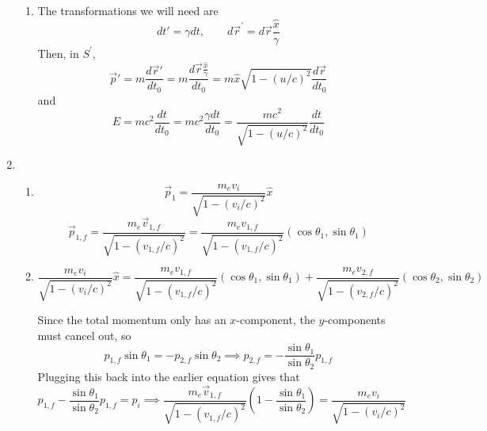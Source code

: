 \documentclass[fleqn]{article}[12pt]
\begin{document}
\begin{enumerate}
\begin{enumerate}
        \item The transformations we will need are
        \begin{equation*}
            dt' = \gamma dt, \qquad d\vec{r}^{'} = d\vec{r}\frac{\hat{x}}{\gamma}
        \end{equation*}
        Then, in $S^{'}$,
        \begin{equation*}
            \vec{p}' = m \frac{d\vec{r}'}{dt_0} = m \frac{d\vec{r}\frac{\hat{x}}{\gamma}}{dt_0} = m \hat{x} \sqrt{1-(u/c)^2}\frac{d\vec{r}}{dt_0}
        \end{equation*}
        and
        \begin{equation*}
            E = mc^2\frac{dt}{dt_0} = mc^2\frac{\gamma dt}{dt_0} = \frac{mc^2}{\sqrt{1-(u/c)^2}}\frac{dt}{dt_0}
        \end{equation*}
    \end{enumerate}

    \item \begin{enumerate}
        \item \begin{equation*}
            \vec{p}_1 = \frac{m_e v_i}{\sqrt{1-(v_i/c)^2}}\hat{x}
        \end{equation*}
        \begin{equation*}
            \vec{p}_{1,f} = \frac{m_e\vec{v}_{1,f}}{\sqrt{1-(v_{1,f}/c)^2}} =
            \frac{m_e v_{1,f}}{\sqrt{1-(v_{1,f}/c)^2}} (\cos{\theta_1}, \sin{\theta_1})
        \end{equation*}

        \item
        \begin{equation*}
            \frac{m_e v_i}{\sqrt{1-(v_i/c)^2}}\hat{x} = \frac{m_e v_{1,f}}{\sqrt{1-(v_{1,f}/c)^2}} (\cos{\theta_1}, \sin{\theta_1}) + \frac{m_e v_{2,f}}{\sqrt{1-(v_{2,f}/c)^2}} (\cos{\theta_2}, \sin{\theta_2})
        \end{equation*}

        Since the total momentum only has an $x$-component, the $y$-components must cancel out, so
        \begin{equation*}
            p_{1,f}\sin \theta_1 = -p_{2,f}\sin\theta_2 \implies p_{2,f} = -\frac{\sin\theta_1}{\sin{\theta_2}}p_{1,f}
        \end{equation*}
        Plugging this back into the earlier equation gives that
        \begin{equation*}
            p_{1,f}-\frac{\sin\theta_1}{\sin{\theta_2}}p_{1,f} = p_i \implies \frac{m_e\vec{v}_{1,f}}{\sqrt{1-(v_{1,f}/c)^2}} \left(1-\frac{\sin\theta_1}{\sin{\theta_2}}\right) = \frac{m_e v_i}{\sqrt{1-(v_i/c)^2}}
        \end{equation*}





\end{enumerate}
\end{enumerate}
\end{document}
